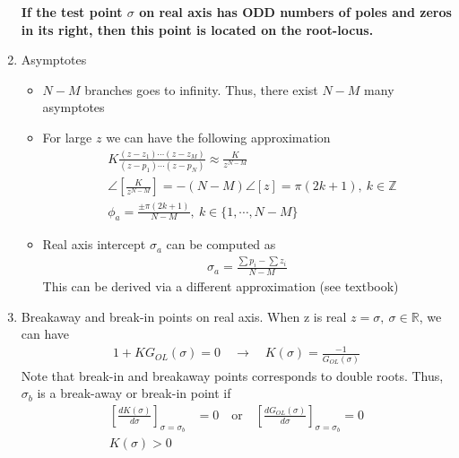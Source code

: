 \documentclass[twoside]{article}
\begin{document}
\begin{enumerate}
\textbf{If the test point $\sigma$ on real axis has ODD numbers of 
poles and zeros in its right, then this point is located 
on the root-locus.}

\item Asymptotes

\begin{itemize}
  \item $N-M$ branches goes to infinity. Thus, there exist $N-M$ many
    asymptotes
  \item For large $z$ we can have the following approximation
 \begin{align*}
  &K \frac{(z - z_1) \cdots (z - z_M)}{(z - p_1) \cdots (z - p_N)}
   \approx \frac{K}{z^{N-M}}
\\
&\angle \left[ \frac{K}{z^{N-M}} \right] = -(N-M) \angle [ z ] = \pi (2 k + 1), \ k \in \mathbb{Z} 
\\
&\phi_{a} = \frac{\pm \pi (2 k + 1)}{N-M}, \ k \in \lbrace 1, \cdots, N-M \rbrace
 \end{align*}
%
  \item Real axis intercept $\sigma_a$ can be computed as
 \begin{align*}
   \sigma_a = \frac{\sum p_i - \sum z_i}{N-M}
 \end{align*}
%
This can be derived via a different approximation (see textbook)
\end{itemize}

\item Breakaway and break-in points on real axis. When z is real 
$z = \sigma, \ \sigma \in \mathbb{R}$, we can have
%
\begin{align*}
1 + K G_{OL} (\sigma) = 0 \quad \rightarrow \quad K(\sigma) =
  \frac{-1}{G_{OL} (\sigma) }
\end{align*}
%
Note that break-in and breakaway points corresponds to 
double roots. Thus, $\sigma_{b}$ is a break-away or break-in 
point if 
%
\begin{align*}
\left[ \frac{d K(\sigma)}{d \sigma} \right]_{\sigma = \sigma_b} &= 0
                                                                \quad
                                                                \mathrm{or}
                                                                \quad
                                                                \left[
                                                                  \frac{d
                                                                  G_{OL}(\sigma)}{d
                                                                  \sigma} \right]_{\sigma = \sigma_b} = 0
\\
K(\sigma) > 0
\end{align*}
%



\end{enumerate}
\end{document}
